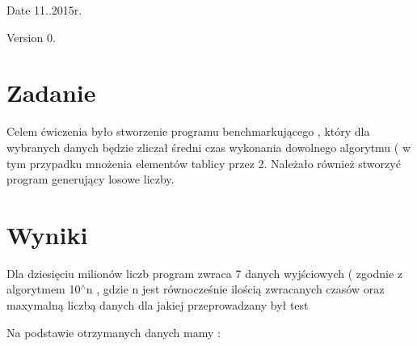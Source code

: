 \begin{DoxyDate}{Date}
11..\+2015r. 
\end{DoxyDate}
\begin{DoxyVersion}{Version}
0. 
\end{DoxyVersion}
\hypertarget{_sprawozdanie_Zadanie}{}\section{Zadanie}\label{_sprawozdanie_Zadanie}
\begin{DoxyVerb} Celem ćwiczenia było stworzenie programu benchmarkującego , który dla wybranych danych będzie zliczał średni czas wykonania dowolnego algorytmu ( w tym przypadku mnożenia elementów tablicy przez 2. Należało również stworzyć program generujący losowe liczby.
\end{DoxyVerb}
 \hypertarget{_sprawozdanie_Wyniki}{}\section{Wyniki}\label{_sprawozdanie_Wyniki}
Dla dziesięciu milionów liczb program zwraca 7 danych wyjściowych ( zgodnie z algorytmem 10$^\wedge$n , gdzie n jest równocześnie ilością zwracanych czasów oraz maxymalną liczbą danych dla jakiej przeprowadzany był test

Na podstawie otrzymanych danych mamy \+:


